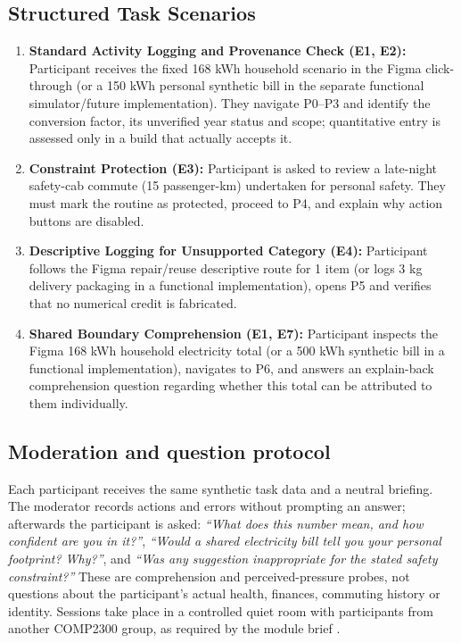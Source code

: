 \documentclass[12pt,a4paper]{article}
\begin{document}
\subsection{Structured Task Scenarios}
\begin{enumerate}[label=\textbf{Task \arabic*:},leftmargin=*]
  \item \textbf{Standard Activity Logging and Provenance Check (E1, E2):} Participant receives the fixed 168 kWh household scenario in the Figma click-through (or a 150 kWh personal synthetic bill in the separate functional simulator/future implementation). They navigate P0--P3 and identify the conversion factor, its unverified year status and scope; quantitative entry is assessed only in a build that actually accepts it.
  \item \textbf{Constraint Protection (E3):} Participant is asked to review a late-night safety-cab commute (15 passenger-km) undertaken for personal safety. They must mark the routine as protected, proceed to P4, and explain why action buttons are disabled.
  \item \textbf{Descriptive Logging for Unsupported Category (E4):} Participant follows the Figma repair/reuse descriptive route for 1 item (or logs 3 kg delivery packaging in a functional implementation), opens P5 and verifies that no numerical credit is fabricated.
  \item \textbf{Shared Boundary Comprehension (E1, E7):} Participant inspects the Figma 168 kWh household electricity total (or a 500 kWh synthetic bill in a functional implementation), navigates to P6, and answers an explain-back comprehension question regarding whether this total can be attributed to them individually.
\end{enumerate}

\subsection{Moderation and question protocol}
Each participant receives the same synthetic task data and a neutral briefing. The moderator records actions and errors without prompting an answer; afterwards the participant is asked: \emph{``What does this number mean, and how confident are you in it?''}, \emph{``Would a shared electricity bill tell you your personal footprint? Why?''}, and \emph{``Was any suggestion inappropriate for the stated safety constraint?''} These are comprehension and perceived-pressure probes, not questions about the participant's actual health, finances, commuting history or identity. Sessions take place in a controlled quiet room with participants from another COMP2300 group, as required by the module brief \cite{modulebrief}.
\end{document}
